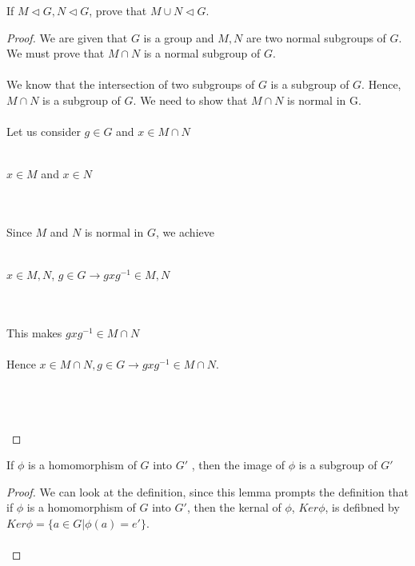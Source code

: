 \documentclass[12pt]{article}
\newenvironment{lemma}[2][Lemma]{\begin{trivlist}
\item[\hskip \labelsep {\bfseries #1}\hskip \labelsep {\bfseries #2.}]}{\end{trivlist}}
\newenvironment{problem}[2][Problem]{\begin{trivlist}
\item[\hskip \labelsep {\bfseries #1}\hskip \labelsep {\bfseries #2.}]}{\end{trivlist}}
\begin{document}
 \begin{problem}{2.5.17}
If $M \triangleleft G, N \triangleleft G$, prove that $M \cup N \triangleleft G$.
\end{problem}

\begin{proof}
We are given that $G$ is a group and $M,N$ are two normal subgroups of $G$. We must prove that $M \cap N$ is a normal subgroup of $G$. \\ \\
We know that the intersection of two subgroups of $G$ is a subgroup of $G$. Hence, $M \cap N$ is a subgroup of $G$. We need to show that $M \cap N$ is normal in G. \\ \\
Let us consider $g \in G$ and $x \in M \cap N$ \\ \\
\centerline{$x \in M$ and $x \in N$} \\ \\
Since $M$ and $N$ is normal in $G$, we achieve \\ \\
\centerline{$x \in M,N$, $g\in G \rightarrow gxg^{-1}\in M,N$} \\ \\
This makes $gxg^{-1} \in M \cap N$ \\ \\
Hence $x\in M \cap N, g\in G \rightarrow gxg^{-1} \in M \cap N$. \\ \\
\centerline{} \\ \\
\end{proof}

\begin{lemma}{2.5.3}
If $\phi$ is a homomorphism of $G$ into $G'$ , then the image of $\phi$ is a subgroup of $G'$ 
\end{lemma}

\begin{proof}
We can look at the definition, since this lemma prompts the definition that if $\phi$ is a homomorphism of $G$ into $G'$, then the kernal of $\phi$, $Ker \phi$, is defibned by $Ker \phi = \{ a \in G | \phi (a) = e' \}$. \\ \\
\end{proof}





 
\end{document}
